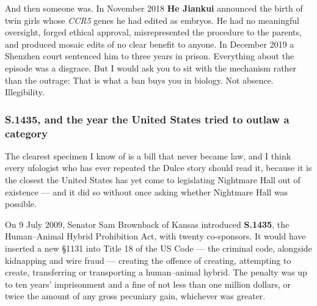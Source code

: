 And then someone was. In November 2018 \textbf{He Jiankui} announced the birth of twin girls whose
\emph{CCR5} genes he had edited as embryos. He had no meaningful oversight, forged ethical approval,
misrepresented the procedure to the parents, and produced mosaic edits of no clear benefit to
anyone. In December 2019 a Shenzhen court sentenced him to three years in prison. Everything about
the episode was a disgrace. But I would ask you to sit with the mechanism rather than the outrage:
 That is what a ban buys you in biology. Not absence. Illegibility.

\Needspace*{0.40\textheight}
\subsubsection*{S.1435, and the year the United States tried to outlaw a category}

The clearest specimen I know of is a bill that never became law, and I think every ufologist who
has ever repeated the Dulce story should read it, because it is the closest the United States has
yet come to legislating Nightmare Hall out of existence --- and it did so without once asking
whether Nightmare Hall was possible.

On 9 July 2009, Senator Sam Brownback of Kansas introduced \textbf{S.1435}, the Human--Animal
Hybrid Prohibition Act, with twenty co-sponsors. It would have inserted a new §1131 into Title 18
of the US Code --- the criminal code, alongside kidnapping and wire fraud --- creating the offence
of creating, attempting to create, transferring or transporting a human--animal hybrid. The penalty
was up to ten years' imprisonment and a fine of not less than one million dollars, or twice the
amount of any gross pecuniary gain, whichever was greater.

